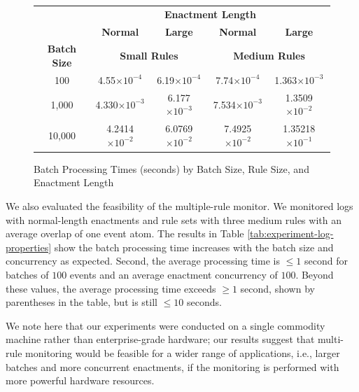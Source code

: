 \begin{figure}[ht]
  {
    \centering
    \begin{footnotesize}
      \renewcommand{\arraystretch}{1.6}
    \begin{tabular}[t]{|c||c|c||c|c||}\cline{2-5}
    \multicolumn{1}{c}{}& \multicolumn{4}{|c|}{\bf Enactment Length}\\\cline{2-5}
    \multicolumn{1}{c}{} & \multicolumn{1}{|c|}{\bf Normal}
    & \multicolumn{1}{|c||}{\bf Large} 
    & \multicolumn{1}{|c|}{\bf Normal}
    & \multicolumn{1}{|c|}{\bf Large} \\\hline
    {\bf Batch Size} & \multicolumn{2}{|c||}{{\bf Small Rules}} & \multicolumn{2}{|c||}{{\bf Medium Rules}}\\\hline\hline
    100             & 4.55$\times10^{-4}$     & 6.19$\times10^{-4}$     & 7.74$\times10^{-4}$     & 1.363$\times10^{-3}$     \\\hline
    1,000           & 4.330$\times10^{-3}$    & 6.177$\times10^{-3}$    & 7.534$\times10^{-3}$    & 1.3509$\times10^{-2}$     \\\hline
    10,000          & 4.2414$\times10^{-2}$   & 6.0769$\times10^{-2}$   & 7.4925$\times10^{-2}$   & 1.35218$\times10^{-1}$     \\\hline
    \end{tabular}
  \end{footnotesize}
    \vspace*{-2mm}
    \caption{Batch Processing Times (seconds) by Batch Size, Rule Size, and Enactment Length}
    \label{fig:eval_avg_proc_time}
    }
  \end{figure}

We also evaluated the feasibility of the multiple-rule monitor.
We monitored logs with normal-length enactments
and rule sets with three medium rules
with an average overlap of one event atom.
The results in Table \ref{tab:experiment-log-properties} show
the batch processing time increases with the batch size and concurrency
as expected.
Second,
the average processing time is ${\le}1$ second
for batches of $100$ events and an average enactment concurrency of $100$.
Beyond these values,
the average processing time exceeds ${\ge}1$ second,
shown by parentheses in the table,
but is still ${\le}10$ seconds.

We note here that 
our experiments were conducted on a single commodity machine
rather than enterprise-grade hardware;
our results suggest that
multi-rule monitoring would be feasible
for a wider range of applications,
i.e., larger batches and more concurrent enactments,
if the monitoring is performed with more powerful hardware resources.

